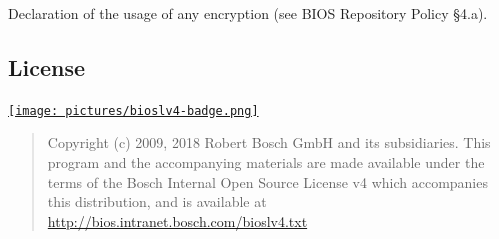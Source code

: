 Declaration of the usage of any encryption (see BIOS Repository Policy
§4.a).

\hypertarget{license}{%
\subsection{License}\label{license}}
\protect\hyperlink{license}{\texttt{[image: pictures/bioslv4-badge.png]}}

\begin{quote}
Copyright (c) 2009, 2018 Robert Bosch GmbH and its subsidiaries. This
program and the accompanying materials are made available under the
terms of the Bosch Internal Open Source License v4 which accompanies
this distribution, and is available at
\url{http://bios.intranet.bosch.com/bioslv4.txt}
\end{quote}
